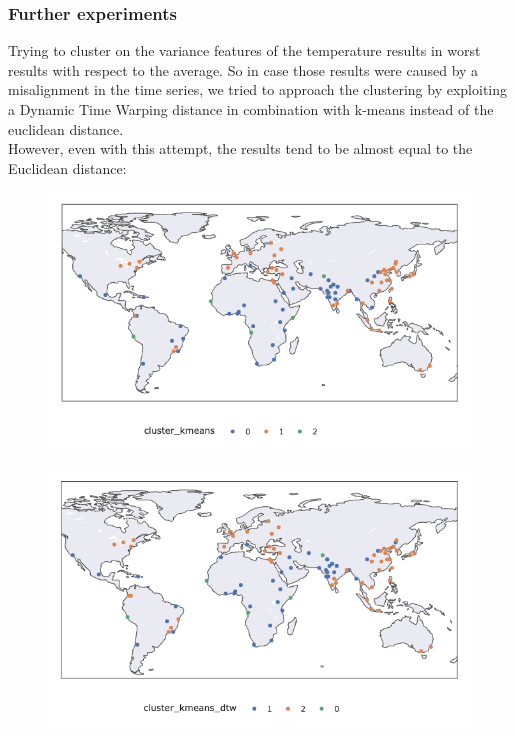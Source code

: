 \subsubsection{Further experiments}
Trying to cluster on the variance features of the temperature results in worst results with respect to the average. So in case those results were caused by a misalignment in the time series, we tried to approach the clustering by exploiting a Dynamic Time Warping distance in combination with k-means instead of the euclidean distance.\\
However, even with this attempt, the results tend to be almost equal to the Euclidean distance:

\begin{figure}[h!]
	\centering
	\begin{minipage}{.5\textwidth}
		\centering
		\includegraphics[width=\textwidth]{plots/timeseries/geoplot_var.png}
		\label{fig:geoplot_var}
	\end{minipage}%
	\begin{minipage}{.5\textwidth}
		\centering
		\includegraphics[width=\textwidth]{plots/timeseries/geoplot_var_dtw.png}
		\label{fig:geoplot_var_dtw}
	\end{minipage}
\end{figure}\\